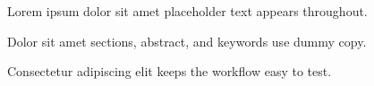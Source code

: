 \item Lorem ipsum dolor sit amet placeholder text appears throughout.
\item Dolor sit amet sections, abstract, and keywords use dummy copy.
\item Consectetur adipiscing elit keeps the workflow easy to test.
